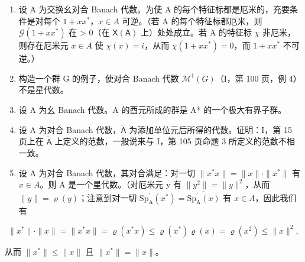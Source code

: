\begin{enumerate}
\def\labelenumi{\arabic{enumi})}
\setcounter{enumi}{6}
\item
  设 A 为交换幺对合 Banach 代数。为使 A 的每个特征标都是厄米的，充要条件是对每个 \(1 + xx^{*}\)，\(x \in A\) 可逆。（若 A 的每个特征标都厄米，则 \(\mathcal{G}(1 + xx^{*})\) 在 \textgreater{} 0（在 \(\mathsf{X}(\mathsf{A})\) 上）处处成立。若 A 的特征标 \(\chi\) 非厄米，则存在厄米元 \(x \in A\) 使 \(\chi(x) = i\)，从而 \(\chi(1 + xx^{*}) = 0\)，而 \(1 + xx^{*}\) 不可逆。）
\item
  构造一个群 G 的例子，使对合 Banach 代数 \(\mathcal{M}^{1}(G)\)（I，第 100 页，例 4）不是星代数。
\item
  设 A 为幺 Banach 代数。A 的酉元所成的群是 A* 的一个极大有界子群。
\item
  设 A 为对合 Banach 代数，\(\widetilde{\mathsf{A}}\) 为添加单位元后所得的代数。证明：I，第 15 页上在 \(\widetilde{\mathsf{A}}\) 上定义的范数，一般说来与 I，第 105 页命题 3 所定义的范数不相一致。
\item
  设 A 为对合 Banach 代数，其对合满足：对一切 \(\|x^{*}x\| = \|x\| \cdot \|x^{*}\|\) 有 \(x \in A\)。则 A 是一个星代数。（对厄米元 y 有 \(\|y^{2}\| = \|y\|^{2}\)，从而 \(\|y\| = \varrho(y)\)；注意到对一切 \(\mathrm{Sp}_{\mathrm{A}}^{\prime}(x^{*}) = \overline{\mathrm{Sp}_{\mathrm{A}}^{\prime}(x)}\) 有 \(x \in A\)，因此我们有
\end{enumerate}

\[
\| x ^ {*} \| \cdot \| x \| = \| x ^ {*} x \| = \varrho (x ^ {*} x) \leqslant \varrho (x ^ {*}) \varrho (x) = \varrho (x ^ {2}) \leqslant \| x \| ^ {2},
\]

从而 \(\|x^{*}\|\leqslant\|x\|\) 且 \(\|x^{*}\|=\|x\|\)。

